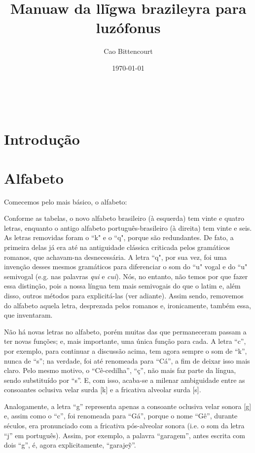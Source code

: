 \documentclass[12pt, a4paper]{article}
\title{Manuaw da llĩgwa brazileyra para luzófonus}
\author{Cao Bittencourt}
\date{\today}
\begin{document}
\maketitle
\thispagestyle{empty}

\newpage \
\thispagestyle{empty}

\newpage
\begin{bilingualpages}
    \rightpage
    \section{Introdução}
    
    \newpage
    \section{Alfabeto}
    Comecemos pelo mais básico, o alfabeto:
    
    \PtTableAbc
    
    Conforme as tabelas, o novo alfabeto brasileiro (à esquerda) tem vinte e quatro letras, enquanto o antigo alfabeto português-brasileiro (à direita) tem vinte e seis. As letras removidas foram o ``k" e o ``q", porque são redundantes. De fato, a primeira delas já era até na antiguidade clássica criticada pelos gramáticos romanos, que achavam-na desnecessária. A letra ``q", por sua vez, foi uma invenção desses mesmos gramáticos para diferenciar o som do ``u" vogal e do ``u" semivogal (e.g. nas palavras \textit{qui} e \textit{cui}). Nós, no entanto, não temos por que fazer essa distinção, pois a nossa língua tem mais semivogais do que o latim e, além disso, outros métodos para explicitá-las (ver adiante). Assim sendo, removemos do alfabeto aquela letra, desprezada pelos romanos e, ironicamente, também essa, que inventaram.

    Não há novas letras no alfabeto, porém muitas das que permaneceram passam a ter novas funções; e, mais importante, uma única função para cada. A letra ``c'', por exemplo, para continuar a discussão acima, tem agora sempre o som de ``k'', nunca de ``s''; na verdade, foi até renomeada para ``Cá'', a fim de deixar isso mais claro. Pelo mesmo motivo, o ``Cê-cedilha'', ``ç'', não mais faz parte da língua, sendo substituído por ``s''. E, com isso, acaba-se a milenar ambiguidade entre as consoantes oclusiva velar surda [k] e a fricativa alveolar surda [s].

    Analogamente, a letra ``g'' representa apenas a consoante oclusiva velar sonora [g] e, assim como o ``c'', foi renomeada para ``Gá'', porque o nome ``Gê'', durante séculos, era pronunciado com a fricativa pós-alveolar sonora (i.e. o som da letra ``j'' em português). Assim, por exemplo, a palavra ``garagem'', antes escrita com dois ``g'', é, agora explicitamente, ``garaje\~y''.


\end{bilingualpages}
\end{document}
